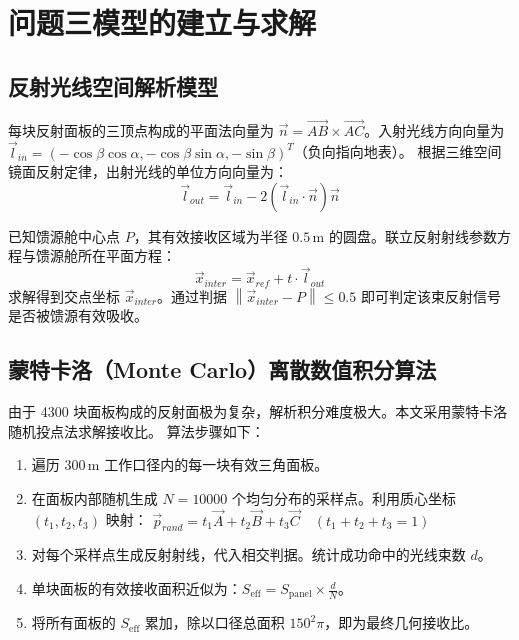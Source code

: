 \documentclass[UTF8,a4paper,zihao=-4]{ctexart}
\newcommand{\norm}[1]{\left\lVert #1 \right\rVert}
\begin{document}
\section{问题三模型的建立与求解}

\subsection{反射光线空间解析模型}
每块反射面板的三顶点构成的平面法向量为 $\vec{n} = \vec{AB} \times \vec{AC}$。入射光线方向向量为 $\vec{l}_{in} = (-\cos\beta\cos\alpha, -\cos\beta\sin\alpha, -\sin\beta)^T$（负向指向地表）。
根据三维空间镜面反射定律，出射光线的单位方向向量为：
\begin{equation}
\vec{l}_{out} = \vec{l}_{in} - 2(\vec{l}_{in} \cdot \vec{n})\vec{n}
\end{equation}

已知馈源舱中心点 $P$，其有效接收区域为半径 $0.5\,\mathrm{m}$ 的圆盘。联立反射射线参数方程与馈源舱所在平面方程：
\begin{equation}
\vec{x}_{inter} = \vec{x}_{ref} + t \cdot \vec{l}_{out}
\end{equation}
求解得到交点坐标 $\vec{x}_{inter}$。通过判据 $\norm{\vec{x}_{inter} - P} \le 0.5$ 即可判定该束反射信号是否被馈源有效吸收。

\subsection{蒙特卡洛（Monte Carlo）离散数值积分算法}
由于 4300 块面板构成的反射面极为复杂，解析积分难度极大。本文采用蒙特卡洛随机投点法求解接收比。
算法步骤如下：
\begin{enumerate}[itemsep=0.2em]
    \item 遍历 $300\,\mathrm{m}$ 工作口径内的每一块有效三角面板。
    \item 在面板内部随机生成 $N=10000$ 个均匀分布的采样点。利用质心坐标 $(t_1, t_2, t_3)$ 映射：
    $ \vec{p}_{rand} = t_1 \vec{A} + t_2 \vec{B} + t_3 \vec{C} \quad (t_1+t_2+t_3=1) $
    \item 对每个采样点生成反射射线，代入相交判据。统计成功命中的光线束数 $d$。
    \item 单块面板的有效接收面积近似为：$S_{\mathrm{eff}} = S_{\mathrm{panel}} \times \frac{d}{N}$。
    \item 将所有面板的 $S_{\mathrm{eff}}$ 累加，除以口径总面积 $150^2\pi$，即为最终几何接收比。
\end{enumerate}
\end{document}

